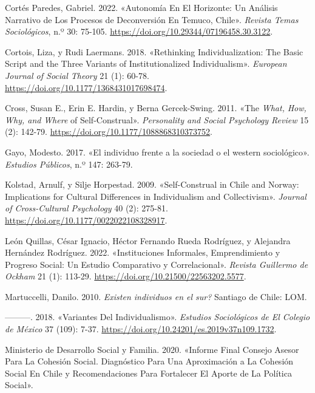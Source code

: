 \documentclass[
  letterpaper,
  DIV=11,
  numbers=noendperiod]{scrartcl}
\newlength{\cslhangindent}
\newenvironment{CSLReferences}[2] %
 {\begin{list}{}{%
  \setlength{\itemindent}{0pt}
  \setlength{\leftmargin}{0pt}
  \setlength{\parsep}{0pt}
  \ifodd #1
   \setlength{\leftmargin}{\cslhangindent}
   \setlength{\itemindent}{-1\cslhangindent}
  \fi
  \setlength{\itemsep}{#2\baselineskip}}}
 {\end{list}}
\begin{document}
\begin{CSLReferences}{1}{0}
Cortés Paredes, Gabriel. 2022. {«Autonom{í}a En El Horizonte: Un
An{á}lisis Narrativo de Los Procesos de Deconversi{ó}n En {Temuco},
{Chile}»}. \emph{Revista Temas Sociol{ó}gicos}, n.º 30: 75-105.
\url{https://doi.org/10.29344/07196458.30.3122}.

Cortois, Liza, y Rudi Laermans. 2018. {«Rethinking Individualization:
{The} Basic Script and the Three Variants of Institutionalized
Individualism»}. \emph{European Journal of Social Theory} 21 (1): 60-78.
\url{https://doi.org/10.1177/1368431017698474}.

Cross, Susan E., Erin E. Hardin, y Berna Gercek-Swing. 2011. {«The
{\emph{What}}{\emph{,} }{\emph{How}}{\emph{,} }{\emph{Why}}{\emph{, and}
}{\emph{Where}} of {Self-Construal}»}. \emph{Personality and Social
Psychology Review} 15 (2): 142-79.
\url{https://doi.org/10.1177/1088868310373752}.

Gayo, Modesto. 2017. {«{El individuo frente a la sociedad o el western
sociol{ó}gico}»}. \emph{Estudios P{ú}blicos}, n.º 147: 263-79.

Kolstad, Arnulf, y Silje Horpestad. 2009. {«Self-{Construal} in {Chile}
and {Norway}: {Implications} for {Cultural Differences} in
{Individualism} and {Collectivism}»}. \emph{Journal of Cross-Cultural
Psychology} 40 (2): 275-81.
\url{https://doi.org/10.1177/0022022108328917}.

León Quillas, César Ignacio, Héctor Fernando Rueda Rodríguez, y
Alejandra Hernández Rodríguez. 2022. {«Instituciones Informales,
Emprendimiento y Progreso Social: Un Estudio Comparativo y
Correlacional»}. \emph{Revista Guillermo de Ockham} 21 (1): 113-29.
\url{https://doi.org/10.21500/22563202.5577}.

Martuccelli, Danilo. 2010. \emph{{{\textquestiondown}Existen individuos
en el sur?}} Santiago de Chile: LOM.

---------. 2018. {«Variantes Del Individualismo»}. \emph{Estudios
Sociol{ó}gicos de El Colegio de M{é}xico} 37 (109): 7-37.
\url{https://doi.org/10.24201/es.2019v37n109.1732}.

Ministerio de Desarrollo Social y Familia. 2020. {«Informe {Final
Consejo Asesor} Para La {Cohesi{ó}n Social}. {Diagn{ó}stico} Para Una
Aproximaci{ó}n a La Cohesi{ó}n Social En {Chile} y Recomendaciones Para
Fortalecer El Aporte de La Pol{í}tica Social»}.


\end{CSLReferences}
\end{document}
